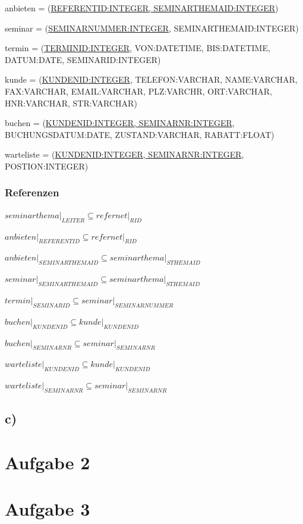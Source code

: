 \documentclass[10pt,a4paper]{report}
\begin{document}
anbieten = (\underline{REFERENTID:INTEGER, SEMINARTHEMAID:INTEGER})

seminar = (\underline{SEMINARNUMMER:INTEGER}, SEMINARTHEMAID:INTEGER)

termin = (\underline{TERMINID:INTEGER}, VON:DATETIME, BIS:DATETIME, DATUM:DATE, SEMINARID:INTEGER)

kunde   = (\underline{KUNDENID:INTEGER}, TELEFON:VARCHAR, NAME:VARCHAR, FAX:VARCHAR, EMAIL:VARCHAR, PLZ:VARCHR, ORT:VARCHAR, HNR:VARCHAR, STR:VARCHAR)

buchen = (\underline{KUNDENID:INTEGER, SEMINARNR:INTEGER}, BUCHUNGSDATUM:DATE, ZUSTAND:VARCHAR, RABATT:FLOAT)

warteliste = (\underline{KUNDENID:INTEGER, SEMINARNR:INTEGER}, POSTION:INTEGER)

\subsubsection{Referenzen}
$seminarthema\vert_{LEITER} \subseteq refernet\vert_{RID}$

$anbieten\vert_{REFERENTID} \subseteq refernet\vert_{RID}$

$anbieten\vert_{SEMINARTHEMAID} \subseteq seminarthema\vert_{STHEMAID}$

$seminar\vert_{SEMINARTHEMAID} \subseteq seminarthema\vert_{STHEMAID}$

$termin\vert_{SEMINARID} \subseteq seminar\vert_{SEMINARNUMMER}$

$buchen\vert_{KUNDENID} \subseteq kunde\vert_{KUNDENID}$

$buchen\vert_{SEMINARNR} \subseteq seminar\vert_{SEMINARNR}$

$warteliste\vert_{KUNDENID} \subseteq kunde\vert_{KUNDENID}$

$warteliste\vert_{SEMINARNR} \subseteq seminar\vert_{SEMINARNR}$

\subsection{c)}



\section{Aufgabe 2}


\section{Aufgabe 3}

\end{document}

